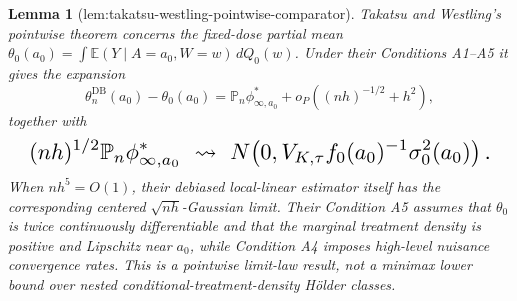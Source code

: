 \documentclass{article}
\newtheorem{lemma}{Lemma}
\begin{document}
\begin{lemma}[lem:takatsu-westling-pointwise-comparator]\label{lem:takatsu-westling-pointwise-comparator}
Takatsu and Westling's pointwise theorem concerns the fixed-dose partial mean \(\theta_0(a_0)=\int\mathbb E(Y\mid A=a_0,W=w)\,dQ_0(w)\). Under their Conditions A1--A5 it gives the expansion
\[
\theta_n^{\mathrm{DB}}(a_0)-\theta_0(a_0)=\mathbb P_n\phi^*_{\infty,a_0}+o_P\!\left((nh)^{-1/2}+h^2\right),
\]
together with
\[
\makebox[\linewidth][c]{\resizebox{0.98\linewidth}{!}{\par\noindent \makebox[\linewidth][c]{\resizebox{0.98\linewidth}{!}{\(\displaystyle \displaystyle (nh)^{1/2}\mathbb P_n\phi^*_{\infty,a_0}\ \rightsquigarrow\ N\!\left(0,V_{K,\tau}f_0(a_0)^{-1}\sigma_0^2(a_0)\right).\)}}\par\noindent}}
\]
When \(nh^5=O(1)\), their debiased local-linear estimator itself has the corresponding centered \(\sqrt{nh}\)-Gaussian limit. Their Condition A5 assumes that \(\theta_0\) is twice continuously differentiable and that the marginal treatment density is positive and Lipschitz near \(a_0\), while Condition A4 imposes high-level nuisance convergence rates. This is a pointwise limit-law result, not a minimax lower bound over nested conditional-treatment-density Hölder classes.
\end{lemma}
\end{document}
